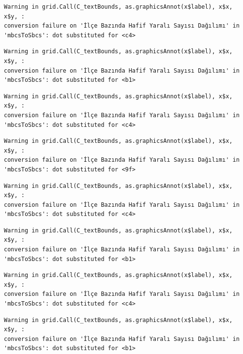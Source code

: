 \documentclass[
  11pt,
  a4paper,
  DIV=11,
  numbers=noendperiod]{scrartcl}
\begin{document}
\begin{verbatim}
Warning in grid.Call(C_textBounds, as.graphicsAnnot(x$label), x$x, x$y, :
conversion failure on 'İlçe Bazında Hafif Yaralı Sayısı Dağılımı' in
'mbcsToSbcs': dot substituted for <c4>
\end{verbatim}

\begin{verbatim}
Warning in grid.Call(C_textBounds, as.graphicsAnnot(x$label), x$x, x$y, :
conversion failure on 'İlçe Bazında Hafif Yaralı Sayısı Dağılımı' in
'mbcsToSbcs': dot substituted for <b1>
\end{verbatim}

\begin{verbatim}
Warning in grid.Call(C_textBounds, as.graphicsAnnot(x$label), x$x, x$y, :
conversion failure on 'İlçe Bazında Hafif Yaralı Sayısı Dağılımı' in
'mbcsToSbcs': dot substituted for <c4>
\end{verbatim}

\begin{verbatim}
Warning in grid.Call(C_textBounds, as.graphicsAnnot(x$label), x$x, x$y, :
conversion failure on 'İlçe Bazında Hafif Yaralı Sayısı Dağılımı' in
'mbcsToSbcs': dot substituted for <9f>
\end{verbatim}

\begin{verbatim}
Warning in grid.Call(C_textBounds, as.graphicsAnnot(x$label), x$x, x$y, :
conversion failure on 'İlçe Bazında Hafif Yaralı Sayısı Dağılımı' in
'mbcsToSbcs': dot substituted for <c4>
\end{verbatim}

\begin{verbatim}
Warning in grid.Call(C_textBounds, as.graphicsAnnot(x$label), x$x, x$y, :
conversion failure on 'İlçe Bazında Hafif Yaralı Sayısı Dağılımı' in
'mbcsToSbcs': dot substituted for <b1>
\end{verbatim}

\begin{verbatim}
Warning in grid.Call(C_textBounds, as.graphicsAnnot(x$label), x$x, x$y, :
conversion failure on 'İlçe Bazında Hafif Yaralı Sayısı Dağılımı' in
'mbcsToSbcs': dot substituted for <c4>
\end{verbatim}

\begin{verbatim}
Warning in grid.Call(C_textBounds, as.graphicsAnnot(x$label), x$x, x$y, :
conversion failure on 'İlçe Bazında Hafif Yaralı Sayısı Dağılımı' in
'mbcsToSbcs': dot substituted for <b1>
\end{verbatim}
\end{document}

